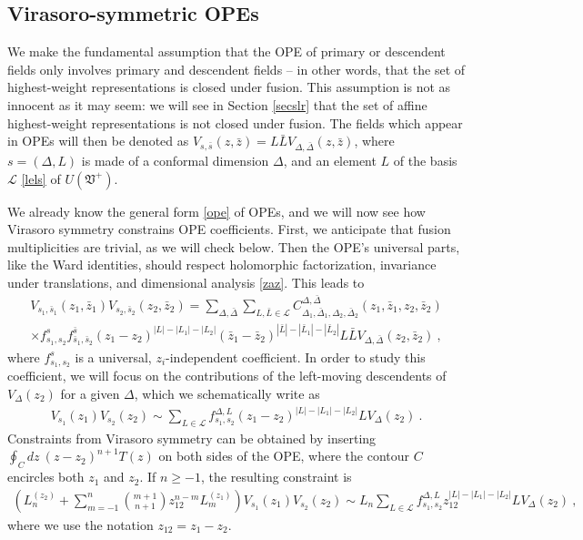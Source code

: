 \documentclass[12pt,a4paper,notitlepage]{report}
\numberwithin{equation}{section}
\theoremstyle{break}
\begin{document}
\subsection{Virasoro-symmetric OPEs \label{secope}}

We make the fundamental assumption that the OPE of primary or descendent fields only involves primary and descendent fields -- in other words, that the set of highest-weight representations is closed under fusion. This assumption is not as innocent as it may seem: we will see in Section \ref{secslr} that the set of affine highest-weight representations is not closed under fusion. The fields which appear in OPEs will then be denoted as $V_{s,\bar{s}}(z,\bar{z}) = L\bar{L} V_{\Delta,\bar{\Delta}}(z,\bar{z})$, where $s=(\Delta,L)$ is made of a conformal dimension $\Delta$, and an element $L$ of the basis $\mathcal{L}$ \eqref{lels} of $U(\mathfrak{V}^+)$.

We already know the general form \eqref{ope} of OPEs, and we will now see how Virasoro symmetry constrains OPE coefficients. First, we anticipate that fusion multiplicities are trivial, as we will check below. Then the OPE's universal parts, like the Ward identities, should respect holomorphic factorization, invariance under translations, and dimensional analysis \eqref{zaz}. This leads to
\begin{multline}
 V_{s_1,\bar{s}_1}(z_1,\bar{z}_1)V_{s_2,\bar{s}_2}(z_2,\bar{z}_2) = \sum_{\Delta,\bar{\Delta}}\sum_{L,\bar{L}\in \mathcal{L}} 
 C_{\Delta_1,\bar{\Delta}_1,\Delta_2,\bar{\Delta}_2}^{\Delta,\bar{\Delta}}(z_1,\bar{z}_1,z_2,\bar{z}_2)
\\ \times
 f_{s_1,s_2}^{s} f_{\bar{s}_1,\bar{s}_2}^{\bar{s}} (z_1-z_2)^{|L|-|L_1|-|L_2|} (\bar{z}_1-\bar{z}_2)^{|\bar{L}|-|\bar{L}_1|-|\bar{L}_2|}
 L\bar{L} V_{\Delta,\bar{\Delta}}(z_2,\bar{z}_2) \ ,
\label{vvs}
\end{multline}
where $f_{s_1,s_2}^s$ is a universal, $z_i$-independent coefficient. In order to study this coefficient, we will focus on the contributions of the left-moving descendents of $V_\Delta(z_2)$ for a given $\Delta$, which we schematically write as
\begin{align}
 V_{s_1}(z_1)V_{s_2}(z_2) \sim \sum_{L\in \mathcal{L}} f_{s_1,s_2}^{\Delta,L} (z_1-z_2)^{|L|-|L_1|-|L_2|} LV_\Delta(z_2)\ .
\label{vvlv}
\end{align}
Constraints from Virasoro symmetry can be obtained by inserting $\oint_C dz\ (z-z_2)^{n+1} T(z)$ on both sides of the OPE, where the contour $C$ encircles both $z_1$ and $z_2$.
If $n\geq -1$, the resulting constraint is 
\begin{align}
 \left(L_n^{(z_2)}+\sum_{m=-1}^{n}\binom{m+1}{n+1} z_{12}^{n-m}L_{m}^{(z_1)}\right) V_{s_1}(z_1)V_{s_2}(z_2) \sim  L_n\sum_{L\in \mathcal{L}} f_{s_1,s_2}^{\Delta,L} z_{12}^{|L|-|L_1|-|L_2|}  LV_\Delta(z_2)\ ,
\label{zlzd}
\end{align}
where we use the notation $z_{12}=z_1-z_2$.
\end{document}
